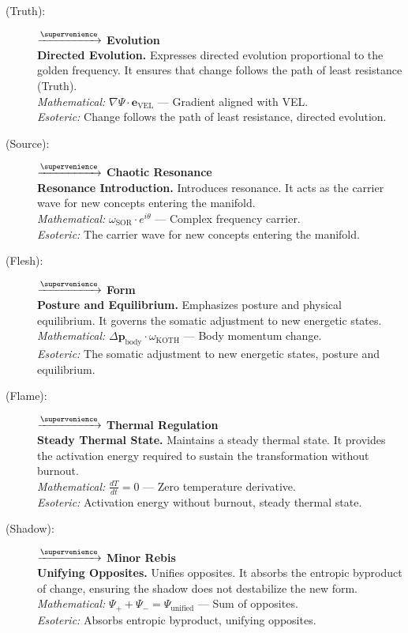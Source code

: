 \begin{description}
    \item[(Truth):] \velara $\xrightarrow{\supervenience}$ \textbf{Evolution} \\
    \textbf{Directed Evolution.} Expresses directed evolution proportional to the golden frequency. It ensures that change follows the path of least resistance (Truth). \\
    \textit{Mathematical:} $\nabla \Psi \cdot \mathbf{e}_{\text{VEL}}$ — Gradient aligned with VEL. \\
    \textit{Esoteric:} Change follows the path of least resistance, directed evolution.

    \item[(Source):] \sorsrih $\xrightarrow{\supervenience}$ \textbf{Chaotic Resonance} \\
    \textbf{Resonance Introduction.} Introduces resonance. It acts as the carrier wave for new concepts entering the manifold. \\
    \textit{Mathematical:} $\omega_{\text{SOR}} \cdot e^{i\theta}$ — Complex frequency carrier. \\
    \textit{Esoteric:} The carrier wave for new concepts entering the manifold.

    \item[(Flesh):] \kothkesh $\xrightarrow{\supervenience}$ \textbf{Form} \\
    \textbf{Posture and Equilibrium.} Emphasizes posture and physical equilibrium. It governs the somatic adjustment to new energetic states. \\
    \textit{Mathematical:} $\Delta \mathbf{p}_{\text{body}} \cdot \omega_{\text{KOTH}}$ — Body momentum change. \\
    \textit{Esoteric:} The somatic adjustment to new energetic states, posture and equilibrium.

    \item[(Flame):] \drehdrem $\xrightarrow{\supervenience}$ \textbf{Thermal Regulation} \\
    \textbf{Steady Thermal State.} Maintains a steady thermal state. It provides the activation energy required to sustain the transformation without burnout. \\
    \textit{Mathematical:} $\frac{dT}{dt} = 0$ — Zero temperature derivative. \\
    \textit{Esoteric:} Activation energy without burnout, steady thermal state.

    \item[(Shadow):] \rheadebh $\xrightarrow{\supervenience}$ \textbf{Minor Rebis} \\
    \textbf{Unifying Opposites.} Unifies opposites. It absorbs the entropic byproduct of change, ensuring the shadow does not destabilize the new form. \\
    \textit{Mathematical:} $\Psi_+ + \Psi_- = \Psi_{\text{unified}}$ — Sum of opposites. \\
    \textit{Esoteric:} Absorbs entropic byproduct, unifying opposites.


\end{description}
